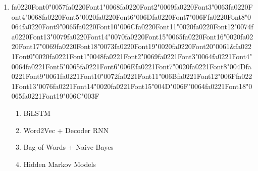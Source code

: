 \documentclass[12pt]{article}
\begin{document}
\begin{enumerate}[label=Q\arabic*.]
 \item {\csname fa0220Font0\endcsname\char"0057}{\csname fa0220Font1\endcsname\char"0068}{\csname fa0220Font2\endcsname\char"0069}{\csname fa0220Font3\endcsname\char"0063}{\csname fa0220Font4\endcsname\char"0068}{\csname fa0220Font5\endcsname\char"0020}{\csname fa0220Font6\endcsname\char"006D}{\csname fa0220Font7\endcsname\char"006F}{\csname fa0220Font8\endcsname\char"0064}{\csname fa0220Font9\endcsname\char"0065}{\csname fa0220Font10\endcsname\char"006C}{\csname fa0220Font11\endcsname\char"0020}{\csname fa0220Font12\endcsname\char"0074}{\csname fa0220Font13\endcsname\char"0079}{\csname fa0220Font14\endcsname\char"0070}{\csname fa0220Font15\endcsname\char"0065}{\csname fa0220Font16\endcsname\char"0020}{\csname fa0220Font17\endcsname\char"0069}{\csname fa0220Font18\endcsname\char"0073}{\csname fa0220Font19\endcsname\char"0020}{\csname fa0220Font20\endcsname\char"0061}\&{\csname fa0221Font0\endcsname\char"0020}{\csname fa0221Font1\endcsname\char"0048}{\csname fa0221Font2\endcsname\char"0069}{\csname fa0221Font3\endcsname\char"0064}{\csname fa0221Font4\endcsname\char"0064}{\csname fa0221Font5\endcsname\char"0065}{\csname fa0221Font6\endcsname\char"006E}{\csname fa0221Font7\endcsname\char"0020}{\csname fa0221Font8\endcsname\char"004D}{\csname fa0221Font9\endcsname\char"0061}{\csname fa0221Font10\endcsname\char"0072}{\csname fa0221Font11\endcsname\char"006B}{\csname fa0221Font12\endcsname\char"006F}{\csname fa0221Font13\endcsname\char"0076}{\csname fa0221Font14\endcsname\char"0020}{\csname fa0221Font15\endcsname\char"004D}{\char"006F}{\char"0064}{\csname fa0221Font18\endcsname\char"0065}{\csname fa0221Font19\endcsname\char"006C}{\char"003F}
 \begin{enumerate}[label=(\Alph*)]
     \item BiLSTM
     \item Word2Vec + Decoder RNN
     \item Bag-of-Words + Naive Bayes
     \item Hidden Markov Models
 \end{enumerate}
 

\end{enumerate}
\end{document}
